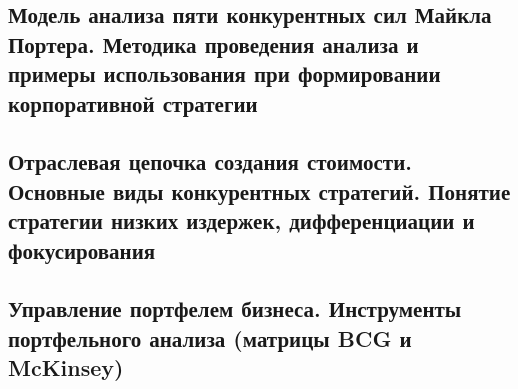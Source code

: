\pagebreak
\subsection{Модель анализа пяти конкурентных сил Майкла Портера. Методика проведения анализа и примеры использования при формировании корпоративной стратегии}




\pagebreak
\subsection{Отраслевая цепочка создания стоимости. Основные виды конкурентных стратегий. Понятие стратегии низких издержек, дифференциации и фокусирования}



\pagebreak
\subsection{Управление портфелем бизнеса. Инструменты портфельного анализа (матрицы BCG и McKinsey)}



